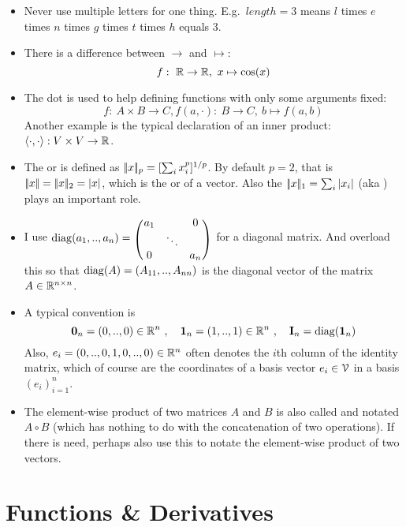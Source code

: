 \begin{itemize}
\item Never use multiple letters for one thing. E.g.\ $length = 3$
means $l$ times $e$ times $n$ times $g$ times $t$ times $h$ equals
$3$.
\item There is a difference between $\to$ and $\mapsto$:
\begin{equation}
 f:~ {\mathbb{R}} \to {\mathbb{R}},~ x \mapsto \cos(x)
\end{equation}
\item The dot is used to help defining functions with only some arguments fixed: 
\begin{equation}
f:~ A\times B \to C \comma f(a,\cdot):~ B \to C,~ b\mapsto f(a,b)
\end{equation}
Another example is the typical declaration of an inner product: $\langle\cdot,\cdot\rangle: V \times V \to {\mathbb{R}}$.
\item The  or  is defined as $|\!|x|\!|_p = [\sum_i x_i^p]^{1/p}$. By default
$p=2$, that is $|\!|x|\!|=|\!|x|\!|_2=|x|$, which is the  or  of a
vector. Also the  $|\!|x|\!|_1 = \sum_i |x_i|$ (aka ) plays an important role.
\item I use $\diag(a_1,..,a_n) = \mat{ccc}{a_1 && 0 \\ & \ddots & \\ 0 &&
a_n}$ for a diagonal matrix. And overload this so that ${\rm diag}(A) = (A_{11},..,A_{nn})$ is the diagonal vector of the matrix $A\in{\mathbb{R}}^{n\times n}$.
\item A typical convention is
\begin{equation}
\boldsymbol 0_n = (0,..,0)\in{\mathbb{R}}^n
~,\quad \boldsymbol 1_n = (1,..,1) \in {\mathbb{R}}^n
~,\quad {\rm\bf I}_n = {\rm diag}(\boldsymbol 1_n)
\end{equation}
Also, $e_i=(0,..,0,1,0,..,0) \in{\mathbb{R}}^n$ often denotes the $i$th column of
the identity matrix, which of course are the coordinates of a basis
vector $e_i\in{\cal V}$ in a basis $(e_i)_{i=1}^n$.
\item The element-wise product of two matrices $A$ and $B$ is also
called  and notated $A\circ B$ (which has nothing to
do with the concatenation of two operations). If there is need,
perhaps also use this to notate the element-wise product of two vectors.
\end{itemize}


\section{Functions \& Derivatives}

